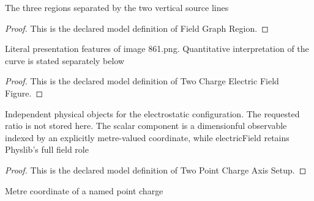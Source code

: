 \begin{definition}
  \label{def:physics:phyx-mini-0861:phyxminiproblems-problemphyxmini0861-fieldgraphregion}
  The three regions separated by the two vertical source lines
\end{definition}
\begin{proof}
  This is the declared model definition of Field Graph Region.
\end{proof}
\begin{definition}
  \label{def:physics:phyx-mini-0861:phyxminiproblems-problemphyxmini0861-twochargeelectricfieldfigure}
  Literal presentation features of image 861.png. Quantitative interpretation of the curve is stated separately below
\end{definition}
\begin{proof}
  This is the declared model definition of Two Charge Electric Field Figure.
\end{proof}
\begin{definition}
  \label{def:physics:phyx-mini-0861:phyxminiproblems-problemphyxmini0861-twopointchargeaxissetup}
  Independent physical objects for the electrostatic configuration. The requested ratio is not stored here. The scalar component is a dimensionful observable indexed by an explicitly metre-valued coordinate, while electricField retains Physlib's full field role
\end{definition}
\begin{proof}
  This is the declared model definition of Two Point Charge Axis Setup.
\end{proof}
\begin{definition}
  \label{def:physics:phyx-mini-0861:phyxminiproblems-problemphyxmini0861-sourcepositioninmeters}
  Metre coordinate of a named point charge
\end{definition}
